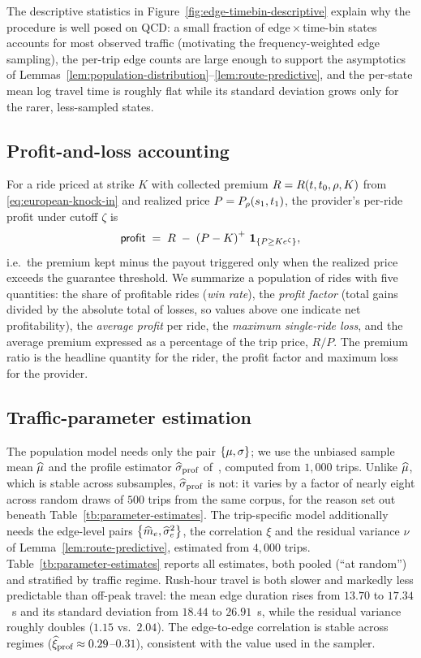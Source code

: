 \documentclass[12pt]{article}
\begin{document}
{{{{{{{{The descriptive statistics in Figure~\ref{fig:edge-timebin-descriptive} explain why the procedure is well posed on QCD: a
small fraction of edge\,$\times$\,time-bin states accounts for most observed traffic
(motivating the frequency-weighted edge sampling), the per-trip edge counts are large enough to
support the asymptotics of Lemmas~\ref{lem:population-distribution}--\ref{lem:route-predictive},
and the per-state mean log travel time is roughly flat while its standard deviation grows only
for the rarer, less-sampled states.
 
%
\subsection{Profit-and-loss accounting}\label{sec:pnl}
For a ride priced at strike $K$ with collected premium $R = R(t,t_0,\rho,K)$ from
\eqref{eq:european-knock-in} and realized price $P = P_\rho({ s_1},t_1)$, the provider's
per-ride profit under cutoff $\zeta$ is
\begin{equation}\label{eq:profit}
\textsf{profit} \;=\; R \;-\; \left(P - K\right)^{+}\,{\bm 1}_{\left\{P \ge K e^{\zeta}\right\}},
\end{equation}
i.e.\ the premium kept minus the payout triggered only when the realized price exceeds the
guarantee threshold. We summarize a population of rides with five quantities: the share of
profitable rides (\emph{win rate}), the \emph{profit factor} (total gains divided by the
absolute total of losses, so values above one indicate net profitability), the \emph{average
profit} per ride, the \emph{maximum single-ride loss}, and the average premium expressed as a
percentage of the trip price, $R/P$. The premium ratio is the headline quantity for the rider,
the profit factor and maximum loss for the provider.
 

\subsection{Traffic-parameter estimation}\label{sec:param-estimation}
The population model needs only the pair $\left\{\mu,\sigma\right\}$; we use the unbiased sample mean
${\widehat \mu}$ and the profile estimator $\widehat \sigma_\text{prof}$ of~\cite[Sec.~3.3.2]{elmasri2020predictive},
computed from $1{,}000$ trips. Unlike ${\widehat \mu}$, which is stable across subsamples,
$\widehat \sigma_\text{prof}$ is not: it varies by a factor of nearly eight across random draws of
$500$ trips from the same corpus, for the reason set out beneath
Table~\ref{tb:parameter-estimates}. The
trip-specific model additionally needs the edge-level pairs $\left\{{\widehat m}_e,{\widehat \sigma^2}_e\right\}$, the
correlation $\xi$ and the residual variance $\nu$ of Lemma~\ref{lem:route-predictive},
estimated from $4{,}000$ trips. Table~\ref{tb:parameter-estimates} reports all estimates, both
pooled (``at random'') and stratified by traffic regime. Rush-hour travel is both slower and
markedly less predictable than off-peak travel: the mean edge duration rises from
$13.70$ to $17.34$~s and its standard deviation from $18.44$ to $26.91$~s, while the residual
variance roughly doubles ($1.15$ vs.\ $2.04$). The edge-to-edge correlation is stable across
regimes (${\widehat{\xi}_\text{prof}} \approx 0.29$--$0.31$), consistent with the value used in the sampler.

}}}}}}}}
\end{document}
